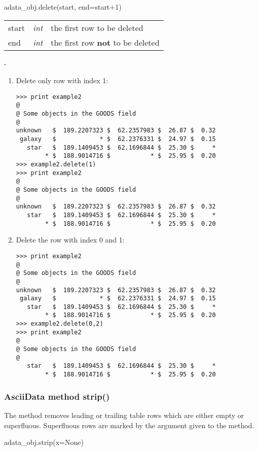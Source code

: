 adata\_obj.delete(start, end=start+1)

\begin{tabular}{lcl}
start &{\it int}& the first row to be deleted\\
end   &{\it int}& the first row {\bf not} to be deleted\\
\end{tabular}

-

\begin{enumerate}
\item Delete only row with index 1:
\begin{verbatim}
>>> print example2
@
@ Some objects in the GOODS field
@
unknown   $  189.2207323 $  62.2357983 $  26.87 $  0.32
 galaxy   $            * $  62.2376331 $  24.97 $  0.15
   star   $  189.1409453 $  62.1696844 $  25.30 $     *
        * $  188.9014716 $           * $  25.95 $  0.20
>>> example2.delete(1)
>>> print example2
@
@ Some objects in the GOODS field
@
unknown   $  189.2207323 $  62.2357983 $  26.87 $  0.32
   star   $  189.1409453 $  62.1696844 $  25.30 $     *
        * $  188.9014716 $           * $  25.95 $  0.20
\end{verbatim}
\item Delete the row with index 0 and 1:
\begin{verbatim}
>>> print example2
@
@ Some objects in the GOODS field
@
unknown   $  189.2207323 $  62.2357983 $  26.87 $  0.32
 galaxy   $            * $  62.2376331 $  24.97 $  0.15
   star   $  189.1409453 $  62.1696844 $  25.30 $     *
        * $  188.9014716 $           * $  25.95 $  0.20
>>> example2.delete(0,2)
>>> print example2
@
@ Some objects in the GOODS field
@
   star   $  189.1409453 $  62.1696844 $  25.30 $     *
        * $  188.9014716 $           * $  25.95 $  0.20
\end{verbatim}
\end{enumerate}


\subsubsection{AsciiData method strip()}
\label{adm_strip}
The method removes leading or trailing table rows which are either empty or
superfluous. Superfluous rows are marked by the argument given to the method.

adata\_obj.strip(x=None)

